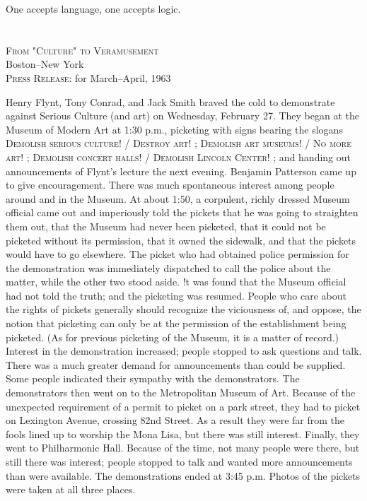 \documentclass[10pt,twoside]{memoir}
\begin{document}
\begin{enumerate}
{\begin{enumerate}
One accepts language, one accepts logic. 


\section{}

{ 
\raggedleft
\textsc{From "Culture" to Veramusement} \\
Boston--New York \\
\textsc{Press Release:} for March--April, 1963 \par
}


Henry Flynt, Tony Conrad, and Jack Smith braved the cold to demonstrate 
against Serious Culture (and art) on Wednesday, February 27. They began at 
the Museum of Modern Art at 1:30 p.m., picketing with signs bearing the 
slogans 
\textsc{Demolish serious culture! / Destroy art!} ; 
\textsc{Demolish art museums! / No more art!} ;
\textsc{Demolish concert halls! / Demolish Lincoln Center!} ;
and handing out announcements of 
Flynt's lecture the next evening. Benjamin Patterson came up to give 
encouragement. There was much spontaneous interest among people around 
and in the Museum. At about 1:50, a corpulent, richly dressed Museum 
official came out and imperiously told the pickets that he was going to 
straighten them out, that the Museum had never been picketed, that it could 
not be picketed without its permission, that it owned the sidewalk, and that 
the pickets would have to go elsewhere. The picket who had obtained police 
permission for the demonstration was immediately dispatched to call the 
police about the matter, while the other two stood aside. !t was found that 
the Museum official had not told the truth; and the picketing was resumed. 
People who care about the rights of pickets generally should recognize the 
viciousness of, and oppose, the notion that picketing can only be at the 
permission of the establishment being picketed. (As for previous picketing of 
the Museum, it is a matter of record.) Interest in the demonstration 
increased; people stopped to ask questions and talk. There was a much 
greater demand for announcements than could be supplied. Some people 
indicated their sympathy with the demonstrators. The demonstrators then 
went on to the Metropolitan Museum of Art. Because of the unexpected 
requirement of a permit to picket on a park street, they had to picket on 
Lexington Avenue, crossing 82nd Street. As a result they were far from the 
fools lined up to worship the Mona Lisa, but there was still interest. Finally, 
they went to Philharmonic Hall. Because of the time, not many people were 
there, but still there was interest; people stopped to talk and wanted more 
announcements than were available. The demonstrations ended at 3:45 p.m. 
Photos of the pickets were taken at all three places. 


\end{enumerate}}
\end{enumerate}
\end{document}
